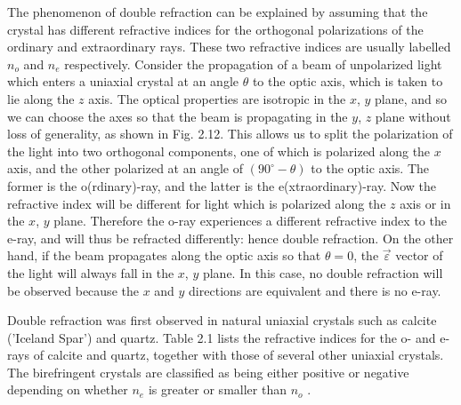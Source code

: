 \documentclass[12pt]{book}
\begin{document}
The phenomenon of double refraction can be explained by assuming that the crystal has different refractive indices for the orthogonal polarizations of the ordinary and extraordinary rays. These two refractive indices are usually labelled $n_o$ and $n_e$ respectively. Consider the propagation of a beam of unpolarized light which enters a uniaxial crystal at an angle $\theta$ to the optic axis, which is taken to lie along the $z$ axis. The optical properties are isotropic in the $x$, $y$ plane, and so we can choose the axes so that the beam is propagating in the $y$, $z$ plane without loss of generality, as shown in Fig. 2.12. This allows us to split the polarization of the light into two orthogonal components, one of which is polarized along the $x$ axis, and the other polarized at an angle of $(90^\circ-\theta)$ to the optic axis. The former is the o(rdinary)-ray, and the latter is the e(xtraordinary)-ray. Now the refractive index will be different for light which is polarized along the $z$ axis or in the $x$, $y$ plane. Therefore the o-ray experiences a different refractive index to the e-ray, and will thus be refracted differently: hence double refraction. On the other hand, if the beam propagates
along the optic axis so that $\theta = 0$, the $\vec{\varepsilon}$ vector of the light will always fall in
the $x$, $y$ plane. In this case, no double refraction will be observed because the $x$ and $y$ directions are equivalent and there is no e-ray.

Double refraction was first observed in natural uniaxial crystals such as calcite ('Iceland Spar') and quartz. Table 2.1 lists the refractive indices for the o- and e-rays of calcite and quartz, together with those of several other uniaxial crystals. The birefringent crystals are classified as being either positive or negative depending on whether $n_e$ is greater or smaller than $n_o$ .
\end{document}
